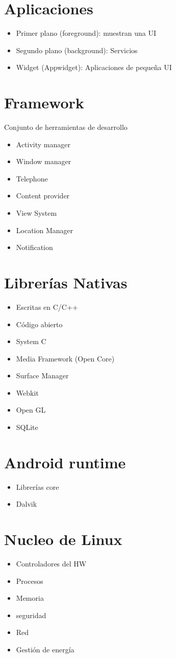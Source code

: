 \documentclass[12pt,a4paper]{report}
\begin{document}
\section{Aplicaciones}
\begin{itemize}
\item Primer plano (foreground): muestran una UI
\item Segundo plano (background): Servicios
\item Widget (Appwidget): Aplicaciones de pequeña UI
\end{itemize}

\section{Framework}
Conjunto de herramientas de desarrollo
\begin{itemize}
\item Activity manager
\item Window manager
\item Telephone
\item Content provider
\item View System
\item Location Manager
\item Notification
\end{itemize}

\section{Librerías Nativas}
\begin{itemize}
\item Escritas en C/C++
\item Código abierto
\item System C
\item Media Framework (Open Core)
\item Surface Manager
\item Webkit
\item Open GL
\item SQLite
\end{itemize}

\section{Android runtime}
\begin{itemize}
\item Librerías core
\item Dalvik
\end{itemize}

\section{Nucleo de Linux}
\begin{itemize}
\item Controladores del HW
\item Procesos
\item Memoria
\item seguridad
\item Red
\item Gestión de energía
\end{itemize}
\end{document}
